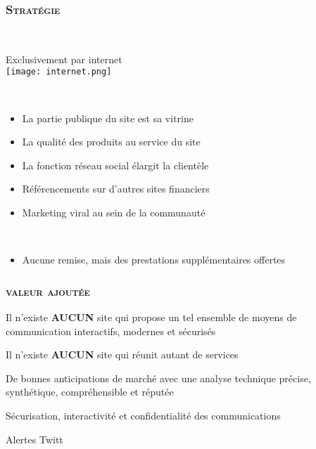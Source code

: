 \documentclass[14pt,a4paper]{beamer}
\begin{document}
\begin{frame}

\frametitle{\color{title}\bf\textsc{Stratégie}}


 \color{tex}{\bf\small DISTRIBUTION}\\
 
 \vspace{-5mm}
 \begin{center}
\footnotesize Exclusivement par internet \\
\texttt{[image: internet.png]}
\end{center}

\pause
\vspace{-3mm}
\color{tex}{\bf\small COMMUNICATION}\\


\begin{itemize}


\item La partie publique  du site est sa vitrine 
\item La qualité  des produits au service du site
\item La fonction réseau social élargit la clientèle
\item Référencements sur d'autres sites financiers
\item Marketing viral au sein de la communauté 


\end{itemize}

\pause

\color{tex}{\bf\small FIDÉLISATION}\\
\begin{itemize}
\item Aucune remise, mais des prestations supplémentaires offertes
\end{itemize}

\end{frame}


\begin{frame}
\frametitle{\color{title}\bf\textsc{valeur ajoutée}}

 Il n'existe {\bf AUCUN} site qui propose un tel ensemble de moyens de communication interactifs, modernes et sécurisés\\
\pause

 Il n'existe {\bf{AUCUN}} site qui réunit autant de services\\
\pause

 De bonnes anticipations de marché avec une analyse technique précise, synthétique, compréhensible et réputée\\
\pause

 Sécurisation, interactivité et  confidentialité  des communications\\
\pause

 Alertes Twitt

\end{frame}
\end{document}
